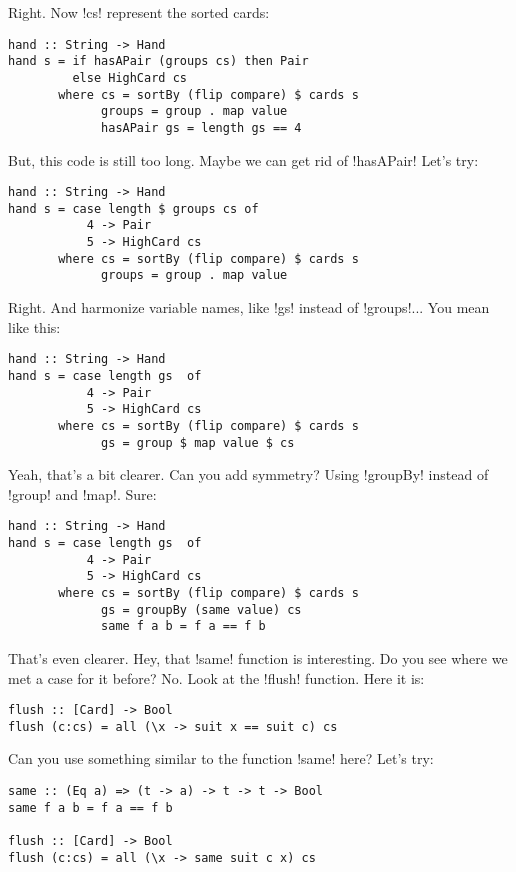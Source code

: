 \lhA \success Right. Now \il!cs! represent the sorted cards:
\begin{lstlisting}[frame=single]
hand :: String -> Hand
hand s = if hasAPair (groups cs) then Pair
         else HighCard cs
       where cs = sortBy (flip compare) $ cards s
             groups = group . map value
             hasAPair gs = length gs == 4 
\end{lstlisting} %
\success But, this code is still too long.
\newpage \lhN Maybe we can get rid of \il!hasAPair!
\lhA \success Let's try:
\begin{lstlisting}[frame=single]
hand :: String -> Hand
hand s = case length $ groups cs of
           4 -> Pair
           5 -> HighCard cs 
       where cs = sortBy (flip compare) $ cards s
             groups = group . map value
\end{lstlisting}
\success Right.
\lhN And harmonize variable names, like \il!gs! instead of \il!groups!...
\lhA \success You mean like this:
\begin{lstlisting}[frame=single]
hand :: String -> Hand
hand s = case length gs  of
           4 -> Pair
           5 -> HighCard cs 
       where cs = sortBy (flip compare) $ cards s
             gs = group $ map value $ cs
\end{lstlisting} %
\success Yeah, that's a bit clearer.
\lhN Can you add symmetry? Using \il!groupBy! instead of \il!group! and \il!map!.
\lhA \success Sure:
\begin{lstlisting}[frame=single]
hand :: String -> Hand
hand s = case length gs  of
           4 -> Pair
           5 -> HighCard cs 
       where cs = sortBy (flip compare) $ cards s
             gs = groupBy (same value) cs
             same f a b = f a == f b
\end{lstlisting} %
\success That's even clearer.
\lhN Hey, that \il!same! function is interesting. Do you see where we met a case for it before?
\lhA No.
\lhN Look at the \il!flush! function.
\lhA Here it is:
\begin{lstlisting}[frame=single]
flush :: [Card] -> Bool
flush (c:cs) = all (\x -> suit x == suit c) cs
\end{lstlisting}
\lhN Can you use something similar to the function \il!same! here?
\lhA Let's try:
\begin{lstlisting}[frame=single]
same :: (Eq a) => (t -> a) -> t -> t -> Bool
same f a b = f a == f b

flush :: [Card] -> Bool
flush (c:cs) = all (\x -> same suit c x) cs

\end{lstlisting}
